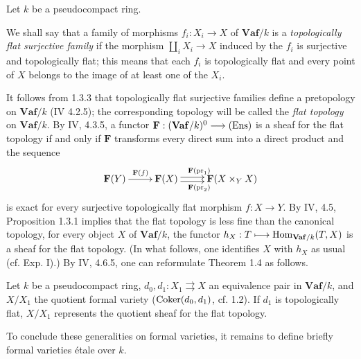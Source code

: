 Let $k$ be a pseudocompact ring.
\begin{definition}{}
We shall say that a family of morphisms $f_i:X_i\to X$ of $\mathbf{Vaf}/k$ is a \emph{topologically flat surjective family} if the morphism $\coprod_i X_i\to X$ induced by the $f_i$ is surjective and topologically flat; this means that each $f_i$ is topologically flat and every point of $X$ belongs to the image of at least one of the $X_i$.
\end{definition}
It follows from 1.3.3 that topologically flat surjective families define a pretopology on $\mathbf{Vaf}/k$ (IV 4.2.5); the corresponding topology will be called the \emph{flat topology} on $\mathbf{Vaf}/k$.
By IV, 4.3.5, a functor $\mathbf F:(\mathbf{Vaf}/k)^0\longrightarrow\textup{(Ens)}$ is a sheaf for the flat topology if and only if $\mathbf F$ transforms every direct sum into a direct product and the sequence
\[
\xymatrix{\mathbf F(Y)\ar[r]^{\mathbf F(f)}&\mathbf F(X)\ar@<.5ex>[r]^{\mathbf F(\mathrm{pr}_1)}\ar@<-.5ex>[r]_{\mathbf F(\mathrm{pr}_2)}&\mathbf F(X\times_Y X)}
\]
is exact for every surjective topologically flat morphism $f:X\to Y$.
By IV, 4.5, Proposition 1.3.1 implies that the flat topology is less fine than the canonical topology, \ie for every object $X$ of $\mathbf{Vaf}/k$, the functor $h_X:T\longmapsto\operatorname{Hom}_{\mathbf{Vaf}/k}(T,X)$ is a sheaf for the flat topology. (In what follows, one identifies $X$ with $h_X$ as usual (cf. Exp. I).)
By IV, 4.6.5, one can reformulate Theorem 1.4 as follows.
\begin{theorem}{}
Let $k$ be a pseudocompact ring, $d_0,d_1:X_1\rightrightarrows X$ an equivalence pair in $\mathbf{Vaf}/k$, and $X/X_1$ the quotient formal variety (\ie $\operatorname{Coker}(d_0,d_1)$, cf. 1.2). If $d_1$ is topologically flat, $X/X_1$ represents the quotient sheaf for the flat topology.
\end{theorem}

To conclude these generalities on formal varieties, it remains to define briefly formal varieties étale over $k$.

